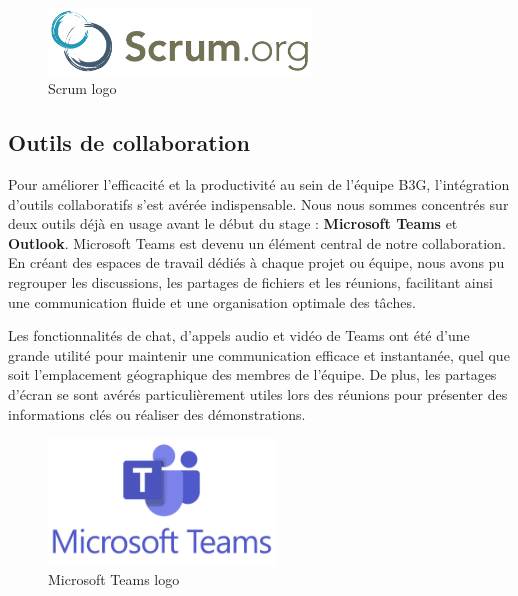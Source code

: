 \begin{figure}[H]
    \centering
    \includegraphics[width=7cm]{Figures/scrumm.png}
    \caption{Scrum logo}
\end{figure}








\subsection{Outils de collaboration}

\hspace{\parindent}Pour améliorer l'efficacité et la productivité au sein de l'équipe B3G, l'intégration d'outils collaboratifs s'est avérée indispensable. Nous nous sommes concentrés sur deux outils déjà en usage avant le début du stage : \textbf{Microsoft Teams} et \textbf{Outlook}. Microsoft Teams est devenu un élément central de notre collaboration. En créant des espaces de travail dédiés à chaque projet ou équipe, nous avons pu regrouper les discussions, les partages de fichiers et les réunions, facilitant ainsi une communication fluide et une organisation optimale des tâches.

Les fonctionnalités de chat, d'appels audio et vidéo de Teams ont été d'une grande utilité pour maintenir une communication efficace et instantanée, quel que soit l'emplacement géographique des membres de l'équipe. De plus, les partages d'écran se sont avérés particulièrement utiles lors des réunions pour présenter des informations clés ou réaliser des démonstrations.\\

\begin{figure}[H]
    \centering
    \includegraphics[width=6cm]{Figures/Microsoft_Teams.png}
    \caption{Microsoft Teams logo}
\end{figure}


